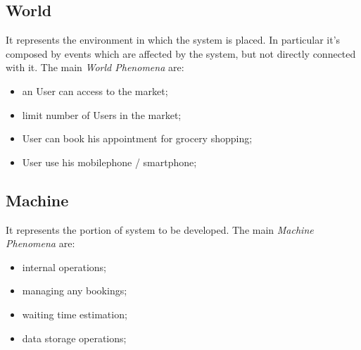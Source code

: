 \subsection{World}

It represents the environment in which the system is placed. In particular it's composed by events which are affected by the system, but not directly connected with it.
The main \textit{World Phenomena} are:

\begin{itemize}
\item an User can access to the market;
\item limit number of Users in the market;
\item User can book his appointment for grocery shopping;
\item User use his mobilephone / smartphone;
\end{itemize}


\subsection{Machine}
It represents the portion of system to be developed.
The main \textit{Machine Phenomena} are:
\begin{itemize}
\item internal operations;
\item managing any bookings;
\item waiting time estimation;
\item data storage operations;
\end{itemize}
